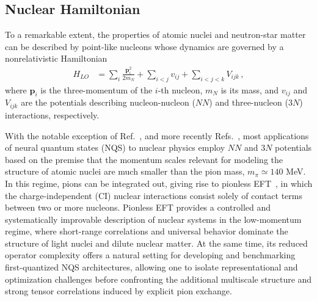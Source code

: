 \subsection{Nuclear Hamiltonian}
\label{sub:hamiltonian}

To a remarkable extent, the properties of atomic nuclei and neutron-star matter can be described by point-like nucleons whose dynamics are governed by a nonrelativistic Hamiltonian  
\begin{align}
H_{LO} &= \sum_i \frac{\mathbf{p}_i^2}{2m_N} 
+ \sum_{i<j} v_{ij} 
+ \sum_{i<j<k} V_{ijk} \,,
\label{eq:ham}
\end{align}
where $\mathbf{p}_i$ is the three-momentum of the $i$-th nucleon, $m_N$ is its mass, and $v_{ij}$ and $V_{ijk}$ are the potentials describing nucleon-nucleon ($N\!N$) and three-nucleon ($3N$) interactions, respectively.

With the notable exception of Ref.~\cite{keeble_machine_2020}, and more recently Refs.~\cite{wen_neural-network_2025,yang_zemach_2025}, most applications of neural quantum states (NQS) to nuclear physics employ $N\!N$ and $3N$ potentials based on the premise that the momentum scales relevant for modeling the structure of atomic nuclei are much smaller than the pion mass, $m_\pi \simeq 140$ MeV. In this regime, pions can be integrated out, giving rise to pionless EFT~\cite{chen_nucleon-nucleon_1999,bedaque_effective_2002}, in which the charge-independent (CI) nuclear interactions consist solely of contact terms between two or more nucleons.
Pionless EFT provides a controlled and systematically improvable description of nuclear systems in the low-momentum regime, where short-range correlations and universal behavior dominate the structure of light nuclei and dilute nuclear matter. At the same time, its reduced operator complexity offers a natural setting for developing and benchmarking first-quantized NQS architectures, allowing one to isolate representational and optimization challenges before confronting the additional multiscale structure and strong tensor correlations induced by explicit pion exchange.



